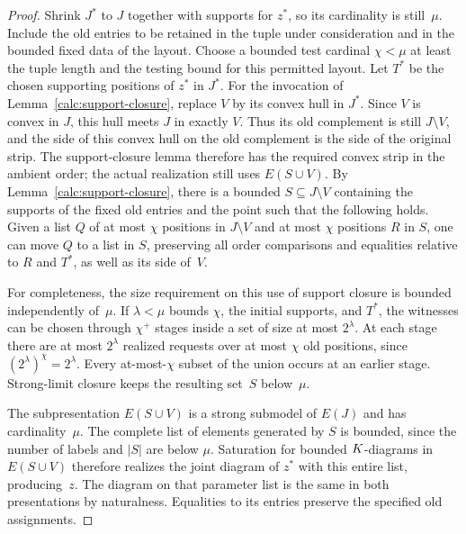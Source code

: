 \begin{proof}
Shrink $J^*$ to $J$ together with supports for $z^*$, so its
cardinality is still~$\mu$.  Include the old entries to be retained
in the tuple under consideration and in the bounded fixed data of
the layout.  Choose a bounded test cardinal $\chi<\mu$ at least
the tuple length and the testing bound for this permitted layout.
Let $T^*$ be the chosen supporting positions of $z^*$ in $J^*$.
For the invocation of Lemma~\ref{calc:support-closure}, replace $V$
by its convex hull in $J^*$.  Since $V$ is convex in $J$, this hull
meets $J$ in exactly $V$.  Thus its old complement is still
$J\setminus V$, and the side of this convex hull on the old
complement is the side of the original strip.  The support-closure
lemma therefore has the required convex strip in the ambient
order; the actual realization still uses $E(S\cup V)$.  By
Lemma~\ref{calc:support-closure}, there is a bounded
$S\subseteq J\setminus V$ containing the supports of the fixed
old entries and the point such that the following holds.  Given a
list $Q$ of at most $\chi$ positions in $J\setminus V$ and at
most $\chi$ positions $R$ in $S$, one can move $Q$ to a list in
$S$, preserving all order comparisons and equalities relative to
$R$ and $T^*$, as well as its side of~$V$.

For completeness, the size requirement on this use of support
closure is bounded independently of~$\mu$.  If $\lambda<\mu$
bounds $\chi$, the initial supports, and $T^*$, the witnesses can
be chosen through $\chi^+$ stages inside a set of size at most
$2^\lambda$.  At each stage there are at most $2^\lambda$
realized requests over at most $\chi$ old positions, since
$(2^\lambda)^\chi=2^\lambda$.  Every at-most-$\chi$ subset of
the union occurs at an earlier stage.  Strong-limit closure keeps
the resulting set~$S$ below~$\mu$.

The subpresentation $E(S\cup V)$ is a strong submodel of $E(J)$
and has cardinality~$\mu$.  The complete list of elements generated
by $S$ is bounded, since the number of labels and $|S|$ are below
$\mu$.  Saturation for bounded $K$-diagrams in
$E(S\cup V)$ therefore realizes the joint diagram of $z^*$ with
this entire list, producing~$z$.  The diagram on that parameter
list is the same in both presentations by naturalness.  Equalities
to its entries preserve the specified old assignments.


\end{proof}
